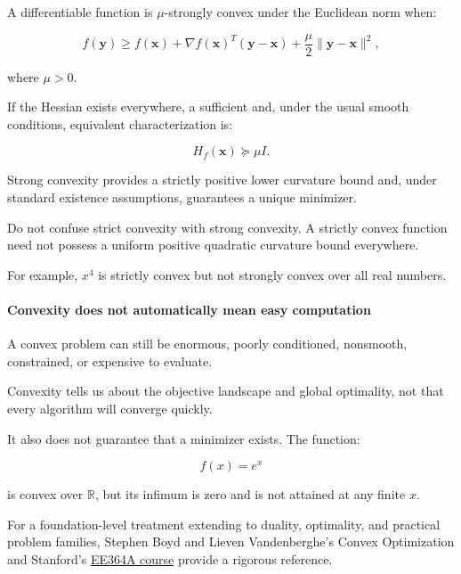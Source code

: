 \hypertarget{02-foundations-ii-ch026-strong-convexity}{}

A differentiable function is \(\mu\)-strongly convex under the Euclidean norm when:

\[
f(\mathbf y)\ge f(\mathbf x)+ \nabla f(\mathbf x)^T(\mathbf y-\mathbf x) +\frac\mu2\|\mathbf y-\mathbf x\|^2,
\]

where \(\mu>0\).

If the Hessian exists everywhere, a sufficient and, under the usual smooth conditions, equivalent characterization is:

\[
H_f(\mathbf x)\succeq\mu I.
\]

Strong convexity provides a strictly positive lower curvature bound and, under standard existence assumptions, guarantees a unique minimizer.

Do not confuse strict convexity with strong convexity. A strictly convex function need not possess a uniform positive quadratic curvature bound everywhere.

For example, \(x^4\) is strictly convex but not strongly convex over all real numbers.

\paragraph{Convexity does not automatically mean easy computation}\label{02-foundations-ii-ch026-convexity-does-not-automatically-mean-easy-computation}

\hypertarget{02-foundations-ii-ch026-convexity-does-not-automatically-mean-easy-computation}{}

A convex problem can still be enormous, poorly conditioned, nonsmooth, constrained, or expensive to evaluate.

Convexity tells us about the objective landscape and global optimality, not that every algorithm will converge quickly.

It also does not guarantee that a minimizer exists. The function:

\[
f(x)=e^x
\]

is convex over \(\mathbb R\), but its infimum is zero and is not attained at any finite \(x\).

For a foundation-level treatment extending to duality, optimality, and practical problem families, Stephen Boyd and Lieven Vandenberghe's Convex Optimization and Stanford's \href{https://web.stanford.edu/class/ee364a/?utm_source=chatgpt.com}{EE364A course} provide a rigorous reference. 


